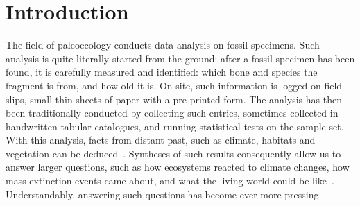 \documentclass[english,twoside,openright]{UH_DS_MSc}
\begin{document}
\mytableofcontents

\mynomenclature

\chapter{Introduction}


The field of paleoecology conducts data analysis on fossil specimens.
Such analysis is quite literally started from the ground: after a fossil specimen has been found, it is 
carefully measured and identified: which bone and species the fragment is from, and how old it is. On site, such information is logged on field slips, small thin sheets of 
paper with a pre-printed form. The analysis has then been traditionally conducted by 
collecting such entries, sometimes collected in handwritten tabular catalogues, and running statistical 
tests on the sample set. With this analysis, facts from distant past, such as climate, habitats and 
vegetation can be deduced~\cite{Faith_Lyman_2019}. Syntheses of such results consequently allow us to 
answer larger questions, such as how ecosystems reacted to climate changes, how mass extinction events 
came about, and what the living world could be like~\cite{Zliobaite2023}. Understandably, answering such 
questions has become ever more pressing.

\end{document}
